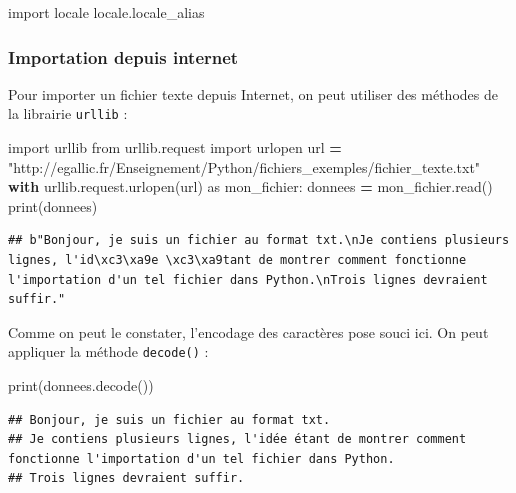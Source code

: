 \documentclass[
  12pt,
]{book}
\newenvironment{Shaded}{\begin{snugshade}}{\end{snugshade}}
\newcommand{\BuiltInTok}[1]{#1}
\newcommand{\ControlFlowTok}[1]{\textcolor[rgb]{0.13,0.29,0.53}{\textbf{#1}}}
\newcommand{\ImportTok}[1]{#1}
\newcommand{\NormalTok}[1]{#1}
\newcommand{\OperatorTok}[1]{\textcolor[rgb]{0.81,0.36,0.00}{\textbf{#1}}}
\newcommand{\StringTok}[1]{\textcolor[rgb]{0.31,0.60,0.02}{#1}}
\numberwithin{equation}{section}
\numberwithin{countremarque}{section}
\begin{document}
\begin{Shaded}
\begin{Highlighting}[]
\ImportTok{import}\NormalTok{ locale}
\NormalTok{locale.locale\_alias}
\end{Highlighting}
\end{Shaded}

\subsubsection{Importation depuis internet}\label{importation-depuis-internet}

Pour importer un fichier texte depuis Internet, on peut utiliser des méthodes de la librairie \texttt{urllib} :

\begin{Shaded}
\begin{Highlighting}[]
\ImportTok{import}\NormalTok{ urllib}
\ImportTok{from}\NormalTok{ urllib.request }\ImportTok{import}\NormalTok{ urlopen}
\NormalTok{url }\OperatorTok{=} \StringTok{"http://egallic.fr/Enseignement/Python/fichiers\_exemples/fichier\_texte.txt"}
\ControlFlowTok{with}\NormalTok{ urllib.request.urlopen(url) }\ImportTok{as}\NormalTok{ mon\_fichier:}
\NormalTok{   donnees }\OperatorTok{=}\NormalTok{ mon\_fichier.read()}
\BuiltInTok{print}\NormalTok{(donnees)}
\end{Highlighting}
\end{Shaded}

\begin{lstlisting}
## b"Bonjour, je suis un fichier au format txt.\nJe contiens plusieurs lignes, l'id\xc3\xa9e \xc3\xa9tant de montrer comment fonctionne l'importation d'un tel fichier dans Python.\nTrois lignes devraient suffir."
\end{lstlisting}

Comme on peut le constater, l'encodage des caractères pose souci ici. On peut appliquer la méthode \texttt{decode()} :

\begin{Shaded}
\begin{Highlighting}[]
\BuiltInTok{print}\NormalTok{(donnees.decode())}
\end{Highlighting}
\end{Shaded}

\begin{lstlisting}
## Bonjour, je suis un fichier au format txt.
## Je contiens plusieurs lignes, l'idée étant de montrer comment fonctionne l'importation d'un tel fichier dans Python.
## Trois lignes devraient suffir.
\end{lstlisting}
\end{document}
